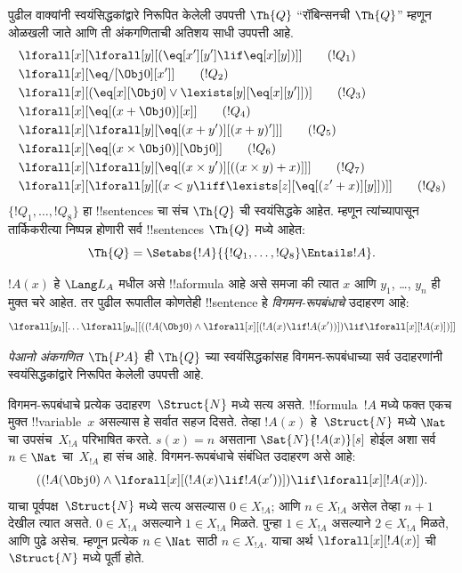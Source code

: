 \documentclass[../../../include/open-logic-section]{subfiles}
\begin{document}
\begin{defn}
पुढील वाक्यांनी स्वयंसिद्धकांद्वारे निरूपित केलेली उपपत्ती
$\Th{Q}$ ``रॉबिन्सनची $\Th{Q}$'' म्हणून ओळखली जाते आणि ती
अंकगणिताची अतिशय साधी उपपत्ती आहे.
\begin{align*}
& \lforall[x][\lforall[y][(\eq[x'][y'] \lif \eq[x][y])]] \tag{$!Q_1$}\\
& \lforall[x][\eq/[\Obj 0][x']] \tag{$!Q_2$}\\
& \lforall[x][(\eq[x][\Obj 0] \lor \lexists[y][\eq[x][y']])] \tag{$!Q_3$}\\
& \lforall[x][\eq[(x + \Obj 0)][x]] \tag{$!Q_4$}\\
& \lforall[x][\lforall[y][\eq[(x + y')][(x + y)']]] \tag{$!Q_5$}\\
& \lforall[x][\eq[(x \times \Obj 0)][\Obj 0]] \tag{$!Q_6$}\\
& \lforall[x][\lforall[y][\eq[(x \times y')][((x \times y) + x)]]] \tag{$!Q_7$}\\
& \lforall[x][\lforall[y][(x < y \liff \lexists[z][\eq[(z' + x)][y]])]] \tag{$!Q_8$}
\end{align*}
$\{!Q_1, \dots, !Q_8\}$ हा !!{sentence}s चा संच $\Th{Q}$ ची
स्वयंसिद्धके आहेत. म्हणून त्यांच्यापासून तार्किकरीत्या निष्पन्न होणारी सर्व
!!{sentence}s $\Th{Q}$ मध्ये आहेत:
\[
\Th{Q} = \Setabs{!A}{\{!Q_1, \dots, !Q_8\} \Entails !A}.
\]
\end{defn}

\begin{defn}
$!A(x)$ हे $\Lang L_A$ मधील असे !!a{formula} आहे असे समजा की
त्यात $x$ आणि $y_1$, \dots, $y_n$ ही मुक्त चरे आहेत. तर पुढील
रूपातील कोणतेही !!{sentence} हे \emph{विगमन-रूपबंधाचे} उदाहरण आहे:
\[
\lforall[y_1][\dots\lforall[y_n][((!A(\Obj 0) \land \lforall[x][(!A(x)
\lif !A(x'))]) \lif \lforall[x][!A(x)])]]
\]

\emph{पेआनो अंकगणित}~$\Th{PA}$ ही $\Th{Q}$ च्या स्वयंसिद्धकांसह
विगमन-रूपबंधाच्या सर्व उदाहरणांनी स्वयंसिद्धकांद्वारे निरूपित
केलेली उपपत्ती आहे.
\end{defn}

\begin{explain}
विगमन-रूपबंधाचे प्रत्येक उदाहरण~$\Struct{N}$ मध्ये सत्य असते.
!!{formula}~$!A$ मध्ये फक्त एकच मुक्त !!{variable}~$x$ असल्यास
हे सर्वात सहज दिसते. तेव्हा $!A(x)$ हे~$\Struct{N}$ मध्ये
$\Nat$ चा उपसंच~$X_{!A}$ परिभाषित करते. $s(x) = n$ असताना
$\Sat{N}{!A(x)}[s]$ होईल अशा सर्व~$n \in \Nat$ चा~$X_{!A}$ हा संच आहे.
विगमन-रूपबंधाचे संबंधित उदाहरण असे आहे:
\[
((!A(\Obj 0) \land \lforall[x][(!A(x) \lif !A(x'))]) \lif 
  \lforall[x][!A(x)]).
\]
याचा पूर्वपक्ष~$\Struct{N}$ मध्ये सत्य असल्यास $0 \in X_{!A}$;
आणि $n \in X_{!A}$ असेल तेव्हा $n+1$ देखील त्यात असते.
$0 \in X_{!A}$ असल्याने $1 \in X_{!A}$ मिळते. पुन्हा
$1 \in X_{!A}$ असल्याने $2 \in X_{!A}$ मिळते, आणि पुढे असेच.
म्हणून प्रत्येक
$n \in \Nat$ साठी $n \in X_{!A}$. याचा अर्थ
$\lforall[x][!A(x)]$ ची~$\Struct{N}$ मध्ये पूर्ती होते.
\end{explain}
\end{document}
